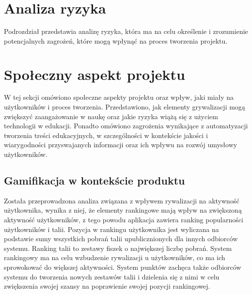 \section{Analiza ryzyka}

Podrozdział przedstawia analizę ryzyka, która ma na celu określenie i zrozumienie potencjalnych zagrożeń, które mogą wpłynąć na proces tworzenia projektu.




\section{Społeczny aspekt projektu}

W tej sekcji omówiono społeczne aspekty projektu oraz wpływ, jaki miały na użytkowników i proces tworzenia. Przedstawiono, jak elementy grywalizacji mogą zwiększyć zaangażowanie w naukę oraz jakie ryzyka wiążą się z użyciem technologii w edukacji. Ponadto omówiono zagrożenia wynikające z automatyzacji tworzenia treści edukacyjnych, w szczególności w kontekście jakości i wiarygodności przyswajanych informacji oraz ich wpływu na rozwój umysłowy użytkowników.

\subsection{Gamifikacja w kontekście produktu}
Została przeprowadzona analiza związana z wpływem rywalizacji na aktywność użytkownika, wynika z niej, że elementy rankingowe mają wpływ na zwiększoną aktywność użytkowników, z tego powodu aplikacja zawiera ranking popularności użytkowników i talii.\cite{ablyGamification} Pozycja w rankingu użytkownika jest wyliczana na podstawie sumy wszystkich pobrań talii upublicznionych dla innych odbiorców systemu. Ranking talii to zestawy fiszek o największej liczbę pobrań. System rankingowy ma na celu wzbudzenie rywalizacji u użytkowników, co ma ich sprowokować do większej aktywności. System punktów zachęca także odbiorców systemu do tworzenia nowych zestawów talii i dzielenia się z nimi w celu zwiększenia swojej szansy na poprawienie swojej pozycji rankingowej.


